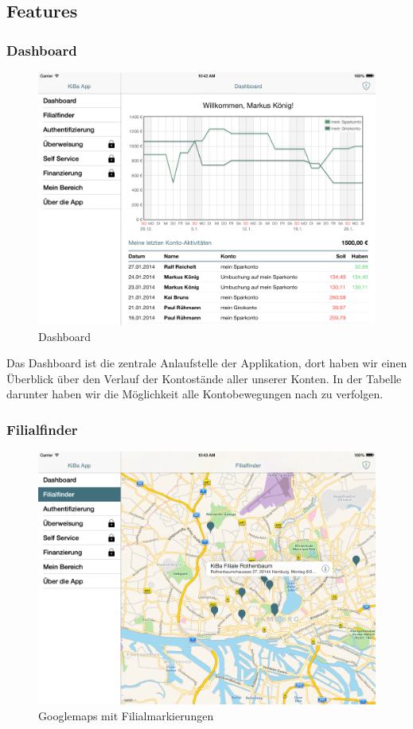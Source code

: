 \subsection{Features}
\subsubsection{Dashboard}
\begin{figure}[h]
	\centering
  \includegraphics[scale=0.4]{Pictures/Dashboard}
	\caption{Dashboard}
	\label{fig1}
\end{figure}

Das Dashboard ist die zentrale Anlaufstelle der Applikation, dort haben wir einen Überblick über den Verlauf der Kontostände aller unserer Konten. In der Tabelle darunter haben wir die Möglichkeit alle Kontobewegungen nach zu verfolgen. 


\subsubsection{Filialfinder}
\begin{figure}[h]
	\centering
  \includegraphics[scale=0.4]{Pictures/filialfinder}
	\caption{Googlemaps mit Filialmarkierungen}
	\label{fig2}
\end{figure}

